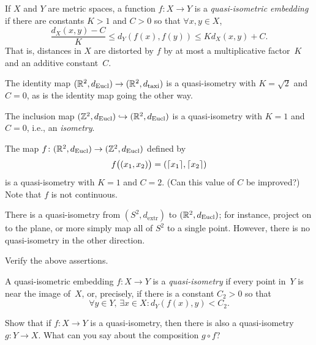 \documentclass[12pt]{amsart}
\begin{document}
\begin{definition}
  If $X$ and $Y$ are metric spaces, a function $f \colon X \to Y$ is a
  \emph{quasi-isometric embedding} if there are constants $K >1$ and
  $C > 0$ so that $\forall x,y \in X$,
  \[
    \frac{d_X(x,y) - C}{K}
      \le d_Y(f(x), f(y)) \le
        K d_X(x,y) + C.
  \]
  That is, distances in $X$ are distorted by $f$ by at most a
  multiplicative factor~$K$ and an additive constant~$C$.
\end{definition}

\begin{example}
  The identity map
  $(\mathbb R^2, d_{\text{Eucl}}) \to (\mathbb R^2, d_{\text{taxi}})$ is a
  quasi-isometry with $K = \sqrt{2}$ and $C=0$, as is the identity map
  going the other way.
\end{example}

\begin{example}
  The inclusion map
  $(\mathbb Z^2,d_{\text{Eucl}}) \hookrightarrow (\mathbb R^2,d_{\text{Eucl}})$ is a
  quasi-isometry with $K=1$ and $C=0$, i.e., an \emph{isometry}.
\end{example}

\begin{example}
  The map $f \colon (\RR^2, d_{\text{Eucl}}) \to (\ZZ^2,
  d_{\text{Eucl}})$ defined by
  \[
    f\bigl((x_1,x_2)\bigr) = (\lceil x_1\rceil, \lceil x_2\rceil)
  \]
  is a quasi-isometry with $K=1$ and $C=2$. (Can this value of $C$ be
  improved?) Note that $f$ is not continuous.
\end{example}

\begin{example}
  There is a quasi-isometry from $(S^2, d_{\text{extr}})$ to
  $(\mathbb R^2, d_{\text{Eucl}})$; for instance, project on to the plane, or
  more simply map all of $S^2$ to a single point. However, there is no
  quasi-isometry in the other direction.
\end{example}

\begin{exercise}
  Verify the above assertions.
\end{exercise}

\begin{definition}
  A quasi-isometric embedding $f \colon X \to Y$ is a
  \emph{quasi-isometry} if every point in~$Y$ is near the image
  of~$X$, or, precisely, if there is a constant $C_2 > 0$ so that
  \[
    \forall y \in Y,\, \exists x \in X\colon d_Y(f(x),y) < C_2.
  \]
\end{definition}

\begin{exercise}
  Show that if $f \colon X \to Y$ is a quasi-isometry, then there is
  also a quasi-isometry $g \colon Y \to X$. What can you
  say about the composition $g \circ f$?
\end{exercise}
\end{document}
